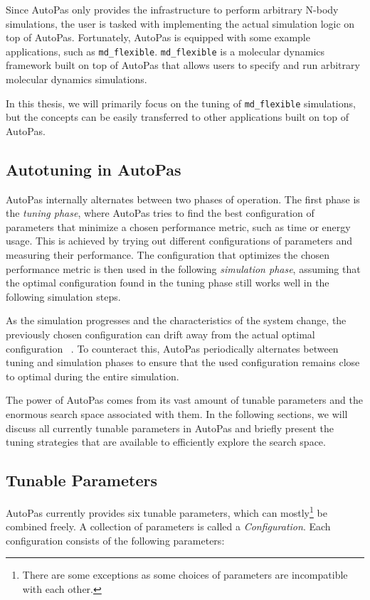 Since AutoPas only provides the infrastructure to perform arbitrary N-body simulations, the user is tasked with implementing the actual simulation logic on top of AutoPas. Fortunately, AutoPas is equipped with some example applications, such as \texttt{md\_flexible}. \texttt{md\_flexible} is a molecular dynamics framework built on top of AutoPas that allows users to specify and run arbitrary molecular dynamics simulations.

In this thesis, we will primarily focus on the tuning of \texttt{md\_flexible} simulations, but the concepts can be easily transferred to other applications built on top of AutoPas.

\subsection{Autotuning in AutoPas}

AutoPas internally alternates between two phases of operation. The first phase is the \emph{tuning phase}, where AutoPas tries to find the best configuration of parameters that minimize a chosen performance metric, such as time or energy usage. This is achieved by trying out different configurations of parameters and measuring their performance. The configuration that optimizes the chosen performance metric is then used in the following \emph{simulation phase}, assuming that the optimal configuration found in the tuning phase still works well in the following simulation steps.

As the simulation progresses and the characteristics of the system change, the previously chosen configuration can drift away from the actual optimal configuration ~\cite{GRATL2022108262}. To counteract this, AutoPas periodically alternates between tuning and simulation phases to ensure that the used configuration remains close to optimal during the entire simulation.

The power of AutoPas comes from its vast amount of tunable parameters and the enormous search space associated with them. In the following sections, we will discuss all currently tunable parameters in AutoPas and briefly present the tuning strategies that are available to efficiently explore the search space.

\subsection{Tunable Parameters}

AutoPas currently provides six tunable parameters, which can mostly\footnote{There are some exceptions as some choices of parameters are incompatible with each other.} be combined freely. A collection of parameters is called a \emph{Configuration}. Each configuration consists of the following parameters:

